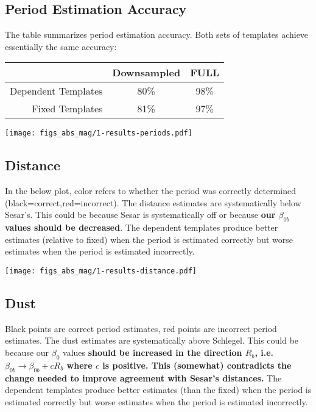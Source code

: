 \documentclass[12pt]{article}
\begin{document}
\subsection{Period Estimation Accuracy}
The table summarizes period estimation accuracy. Both sets of templates achieve essentially the same accuracy:

\begin{center}
\begin{tabular}{ r | c | c }
& Downsampled & FULL \\
  \hline
  Dependent Templates & 80\% & 98\%\\ 
  Fixed Templates & 81\% & 97\%\\ 
  \hline 
\end{tabular}
\end{center}


\begin{center}
  \texttt{[image: figs\_abs\_mag/1-results-periods.pdf]}
\end{center}



\subsection{Distance}

In the below plot, color refers to whether the period was correctly determined (black=correct,red=incorrect). The distance estimates are systematically below Sesar's. This could be because Sesar is systematically off or because \textbf{our $\beta_{0b}$ values should be decreased}.  The dependent templates produce better estimates (relative to fixed) when the period is estimated correctly but worse estimates when the period is estimated incorrectly.

\begin{center}
  \texttt{[image: figs\_abs\_mag/1-results-distance.pdf]}
\end{center}


\subsection{Dust}

Black points are correct period estimates, red points are incorrect period estimates. The dust estimates are systematically above Schlegel. This could be because our $\beta_{0}$ values \textbf{should be increased in the direction $R_b$, i.e. $\beta_{0b} \rightarrow \beta_{0b} + cR_b$ where $c$ is positive. This (somewhat) contradicts the change needed to improve agreement with Sesar's distances.}  The dependent templates produce better estimates (than the fixed) when the period is estimated correctly but worse estimates when the period is estimated incorrectly.
\end{document}

